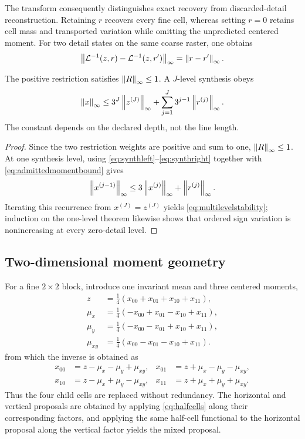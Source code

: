 The transform consequently distinguishes exact recovery from
discarded-detail reconstruction. Retaining \(r\) recovers every fine cell,
whereas setting \(r=0\) retains cell mass and transported variation while
omitting the unpredicted centered moment. For two detail states on the same
coarse raster, one obtains
\begin{equation}
 \left\lVert\mathcal L^{-1}(z,r)-\mathcal L^{-1}(z,r')\right\rVert_\infty
 =\left\lVert r-r'\right\rVert_\infty.
 \label{eq:detailstability}
\end{equation}

\begin{proposition}
The positive restriction satisfies \(\left\lVert R\right\rVert_\infty\leq1\). A \(J\)-level
synthesis obeys
\begin{equation}
 \left\lVert x\right\rVert_\infty\leq3^J\left\lVert z^{(J)}\right\rVert_\infty
 +\sum_{j=1}^{J}3^{j-1}\left\lVert r^{(j)}\right\rVert_\infty.
 \label{eq:multilevelstability}
\end{equation}
The constant depends on the declared depth, not the line length.
\end{proposition}

\begin{proof}
Since the two restriction weights are positive and sum to one,
\(\left\lVert R\right\rVert_\infty\leq1\). At one synthesis level, using
\eqref{eq:synthleft}--\eqref{eq:synthright} together with
\eqref{eq:admittedmomentbound} gives
\[
 \left\lVert x^{(j-1)}\right\rVert_\infty
 \leq3\left\lVert x^{(j)}\right\rVert_\infty+\left\lVert r^{(j)}\right\rVert_\infty.
\]
Iterating this recurrence from \(x^{(J)}=z^{(J)}\) yields
\eqref{eq:multilevelstability}; induction on the one-level theorem likewise
shows that ordered sign variation is nonincreasing at every zero-detail
level.
\end{proof}

\subsection{Two-dimensional moment geometry}

For a fine \(2\times2\) block, introduce one invariant mean and three
centered moments,
\begin{align}
 z&=\tfrac14(x_{00}+x_{01}+x_{10}+x_{11}),\nonumber\\
 \mu_x&=\tfrac14(-x_{00}+x_{01}-x_{10}+x_{11}),\nonumber\\
 \mu_y&=\tfrac14(-x_{00}-x_{01}+x_{10}+x_{11}),\nonumber\\
 \mu_{xy}&=\tfrac14(x_{00}-x_{01}-x_{10}+x_{11}).
 \label{eq:blockmoments}
\end{align}
from which the inverse is obtained as
\begin{align}
 x_{00}&=z-\mu_x-\mu_y+\mu_{xy},&
 x_{01}&=z+\mu_x-\mu_y-\mu_{xy},\nonumber\\
 x_{10}&=z-\mu_x+\mu_y-\mu_{xy},&
 x_{11}&=z+\mu_x+\mu_y+\mu_{xy}.
 \label{eq:blockinverse}
\end{align}
Thus the four child cells are replaced without redundancy. The horizontal
and vertical proposals are obtained by applying \eqref{eq:halfcells} along
their corresponding factors, and applying the same half-cell functional to
the horizontal proposal along the vertical factor yields the mixed proposal.

